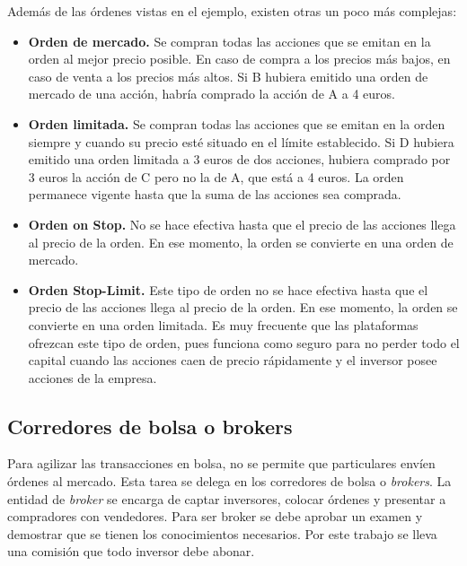 \documentclass[12pt,a4paper]{article}
\begin{document}
		Adem\'as de las \'ordenes vistas en el ejemplo, existen otras un poco m\'as complejas:
		\begin{itemize}
			
			\item \textbf{Orden de mercado.} Se compran todas las acciones que se emitan en la orden al mejor precio posible. En caso de compra a los precios m\'as bajos, en caso de venta a los precios m\'as altos. Si B hubiera emitido una orden de mercado de una acci\'on, habría comprado la acci\'on de A a 4 euros.
			
			\item \textbf{Orden limitada.} Se compran todas las acciones que se emitan en la orden siempre y cuando su precio est\'e situado en el l\'imite establecido. Si D hubiera emitido una orden limitada a 3 euros de dos acciones, hubiera comprado por 3 euros la acci\'on de C pero no la de A, que est\'a a 4 euros. La orden permanece vigente hasta que la suma de las acciones sea comprada.
			
			\item \textbf{Orden on Stop.} No se hace efectiva hasta que el precio de las acciones llega al precio de la orden. En ese momento, la orden se convierte en una orden de mercado.
			
			\item \textbf{Orden Stop-Limit.} Este tipo de orden no se hace efectiva hasta que el precio de las acciones llega al precio de la orden. En ese momento, la orden se convierte en una orden limitada. Es muy frecuente que las plataformas ofrezcan este tipo de orden, pues funciona como seguro para no perder todo el capital cuando las acciones caen de precio r\'apidamente y el inversor posee acciones de la empresa. 
			
		\end{itemize} 
		
		\subsection{Corredores de bolsa o brokers}
	
		Para agilizar las transacciones en bolsa, no se permite que particulares env\'ien \'ordenes al mercado. Esta tarea se delega en los corredores de bolsa o \textit{brokers}. La entidad de \textit{broker} se encarga de captar inversores, colocar \'ordenes y presentar a compradores con vendedores. Para ser broker se debe aprobar un examen y demostrar que se tienen los conocimientos necesarios. Por este trabajo se lleva una comisi\'on que todo inversor debe abonar. 
		
\end{document}
